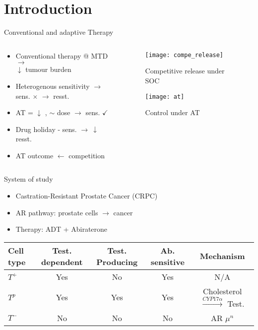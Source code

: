 \section{Introduction}

\begin{frame}{Conventional and adaptive Therapy}
  \begin{columns}
    \begin{column}{0.45\textwidth}
      \begin{itemize}
        \item Conventional therapy @ MTD $\rightarrow$\\
        $\downarrow$ tumour burden \cite{Frei}
        \item Heterogenous sensitivity $\rightarrow$\\
        sens. $\times$ $\rightarrow$ resst. \cite{Scott}
        \item AT = $\downarrow$ , $\sim$ dose $\rightarrow$ sens. $\checkmark$ \cite{Gatenby}
        \item Drug holiday - sens. $\rightarrow\ \downarrow$ resst.
        \item AT outcome $\leftarrow$ competition
      \end{itemize}
    \end{column}
    \begin{column}{0.55\textwidth}
      \begin{figure}[h]
        \centering
        \texttt{[image: compe\_release]}
        \caption{Competitive release under SOC}
      \end{figure}
      \begin{figure}[h]
        \centering
        \texttt{[image: at]}
        \caption{Control under AT}
      \end{figure}
    \end{column}
  \end{columns}
\end{frame}

\begin{frame}{System of study}
  \begin{itemize}
    \item Castration-Resistant Prostate Cancer (CRPC)
    \item AR pathway: prostate cells $\rightarrow$ cancer \cite{Heinlein}
    \item Therapy: ADT + Abiraterone
  \end{itemize}
  \begin{table}
    \centering
    \begin{tabular}{|l|c|c|c|c|}
    \hline
    Cell type & Test. dependent & Test. Producing & Ab. sensitive & Mechanism \\
    \hline
    $T^+$ & Yes & No & Yes & N/A \\
    $T^p$ & Yes & Yes & Yes & Cholesterol $\xrightarrow{CYP17\alpha}$ Test.\\
    $T^-$ & No & No & No & AR $\mu^n$\\
    \hline
    \end{tabular}
  \end{table}
\end{frame}

